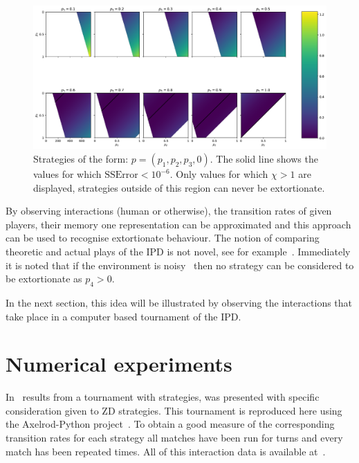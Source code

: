 \documentclass[a4paper]{article}
\begin{document}
\begin{figure}[!htbp]
    \begin{center}
        \includegraphics[width=\textwidth]{assets/img/examples_of_extortion/main.pdf}
        \caption{Strategies of the form:
                 \(p=(p_1, p_2, p_3, 0)\). The solid line shows the values for
                 which \(\text{SSError} < 10 ^ {-6}\). Only values for which \(\chi > 1\) are
                 displayed, strategies outside of this region can never be
                 extortionate.}
        \label{fig:examples_of_extortion}
    \end{center}
\end{figure}

By observing interactions (human or otherwise), the transition rates of given
players, their memory one representation can be approximated and this approach
can be used to recognise extortionate behaviour. The notion of comparing
theoretic and actual plays of the IPD is not novel, see for
example~\cite{Rand2013}.  Immediately it is noted that if the environment is
noisy~\cite{Wu1995} then no strategy can be considered to be extortionate as
\(p_4>0\).

In the next section, this idea will be illustrated by observing the interactions
that take place in a computer based tournament of the IPD\@.

\section{Numerical experiments}\label{sec:numerical-experiments}

In~\cite{Stewart2012} results from a tournament with
 strategies,
was presented with specific consideration given to ZD strategies. This
tournament is reproduced here using the Axelrod-Python
project~\cite{Knight2016}. To obtain a good measure of the corresponding
transition rates for each strategy all matches have been run for
 turns and every match has been
repeated  times. All of this
interaction data is available at~\cite{vincent_knight_2018_1297075}.
\end{document}
